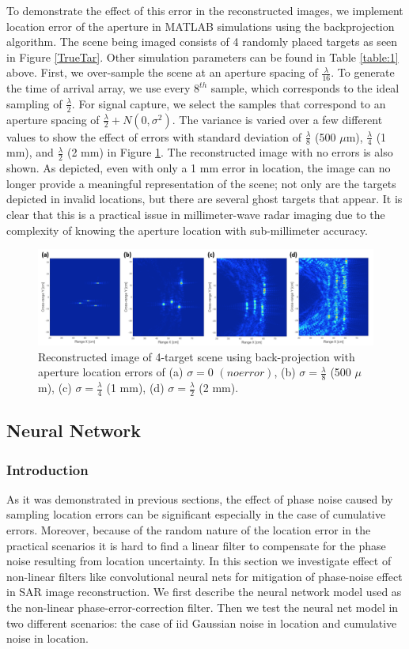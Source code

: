 \documentclass{article}
\begin{document}
To demonstrate the effect of this error in the reconstructed images, we implement location error of the aperture in MATLAB simulations using the backprojection algorithm. The scene being imaged consists of 4 randomly placed targets as seen in Figure \ref{TrueTar}. Other simulation parameters can be found in Table \ref{table:1} above. First, we over-sample the scene at an aperture spacing of $\frac{\lambda}{16}$. To generate the time of arrival array, we use every $8^{th}$ sample, which corresponds to the ideal sampling of $\frac{\lambda}{2}$. For signal capture, we select the samples that correspond to an aperture spacing of $\frac{\lambda}{2} + N(0,\sigma^2)$. The variance is varied over a few different values to show the effect of errors with standard deviation of $\frac{\lambda}{8}$ (500 $\mu$m), $\frac{\lambda}{4}$ (1 mm), and $\frac{\lambda}{2}$ (2 mm) in Figure \ref{ErrorIm}. The reconstructed image with no errors is also shown. As depicted, even with only a 1 mm error in location, the image can no longer provide a meaningful representation of the scene; not only are the targets depicted in invalid locations, but there are several ghost targets that appear. It is clear that this is a practical issue in millimeter-wave radar imaging due to the complexity of knowing the aperture location with sub-millimeter accuracy.
\begin{figure}[h!]
    \centering
    \includegraphics[width=\textwidth]{Figures/ErrorIm2.png}
\caption{Reconstructed image of 4-target scene using back-projection with aperture location errors of (a) $\sigma=0$  ${(no error)}$, (b)   $\sigma=\frac{\lambda}{8}$ (500 $\mu${m}), (c)$ $  $\sigma=\frac{\lambda}{4}$ (1 mm), (d)$ $  $\sigma=\frac{\lambda}{2}$ (2 mm).}
\label{ErrorIm}
\end{figure}
\subsection{Neural Network}
\subsubsection{Introduction}
\indent \indent
As it was demonstrated in previous sections, the effect of phase noise caused by sampling location errors can be significant especially in the case of cumulative errors. Moreover, because of the random nature of the location error in the practical scenarios it is hard to find a linear filter to compensate for the phase noise resulting from location uncertainty. In this section we investigate effect of non-linear filters like convolutional neural nets for mitigation of phase-noise effect in SAR image reconstruction. We first describe the neural network model used as the non-linear phase-error-correction filter. Then we test the neural net model in two different scenarios: the case of iid Gaussian noise in location and cumulative noise in location. 
\end{document}
